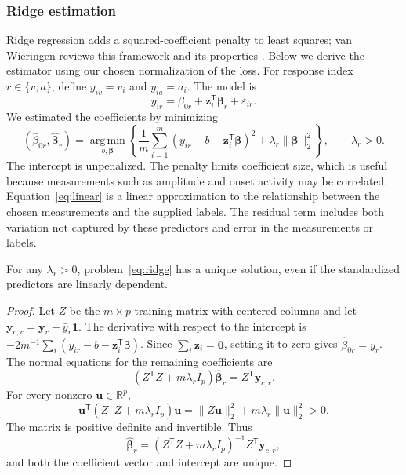 \subsubsection{Ridge estimation}

Ridge regression adds a squared-coefficient penalty to least squares; van Wieringen reviews this framework and its properties \cite{vanwieringen2026ridge}. Below we derive the estimator using our chosen normalization of the loss.
For response index $r\in\{v,a\}$, define $y_{iv}=v_i$ and $y_{ia}=a_i$. The model is
\begin{equation}
 y_{ir}=\beta_{0r}+\bm{z}_i^{\mathsf T}\bm{\beta}_r+\varepsilon_{ir}.
 \label{eq:linear}
\end{equation}
We estimated the coefficients by minimizing
\begin{equation}
 (\widehat\beta_{0r},\widehat{\bm\beta}_r)
 =\operatorname*{arg\,min}_{b,\bm\beta}
 \left\{\frac{1}{m}\sum_{i=1}^{m}
 (y_{ir}-b-\bm z_i^{\mathsf T}\bm\beta)^2
 +\lambda_r\lVert\bm\beta\rVert_2^2\right\},\qquad\lambda_r>0.
 \label{eq:ridge}
\end{equation}
The intercept is unpenalized. The penalty limits coefficient size, which is useful because measurements such as amplitude and onset activity may be correlated. Equation~\eqref{eq:linear} is a linear approximation to the relationship between the chosen measurements and the supplied labels. The residual term includes both variation not captured by these predictors and error in the measurements or labels.

\begin{prop}
For any $\lambda_r>0$, problem~\eqref{eq:ridge} has a unique solution, even if the standardized predictors are linearly dependent.
\end{prop}
\begin{proof}
Let $Z$ be the $m\times p$ training matrix with centered columns and let $\bm y_{c,r}=\bm y_r-\bar y_r\bm 1$. The derivative with respect to the intercept is $-2m^{-1}\sum_i(y_{ir}-b-\bm z_i^{\mathsf T}\bm\beta)$. Since $\sum_i\bm z_i=\bm0$, setting it to zero gives $\widehat\beta_{0r}=\bar y_r$. The normal equations for the remaining coefficients are
\[
 (Z^{\mathsf T}Z+m\lambda_r I_p)\widehat{\bm\beta}_r
 =Z^{\mathsf T}\bm y_{c,r}.
\]
For every nonzero $\bm u\in\mathbb R^p$,
\[
 \bm u^{\mathsf T}(Z^{\mathsf T}Z+m\lambda_r I_p)\bm u
 =\lVert Z\bm u\rVert_2^2+m\lambda_r\lVert\bm u\rVert_2^2>0.
\]
The matrix is positive definite and invertible. Thus
\[
 \widehat{\bm\beta}_r
 =(Z^{\mathsf T}Z+m\lambda_r I_p)^{-1}Z^{\mathsf T}\bm y_{c,r},
\]
and both the coefficient vector and intercept are unique.
\end{proof}


